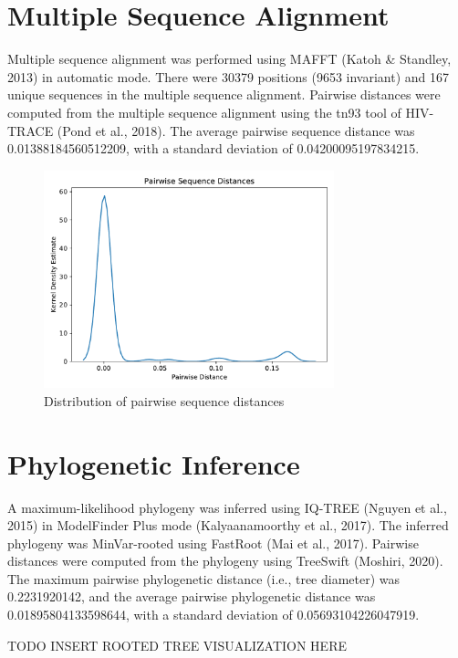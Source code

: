 \documentclass{article}
\begin{document}
\section{Multiple Sequence Alignment}
Multiple sequence alignment was performed using MAFFT (Katoh \& Standley, 2013) in automatic mode.
There were 30379 positions (9653 invariant) and 167 unique sequences in the multiple sequence alignment.
Pairwise distances were computed from the multiple sequence alignment using the tn93 tool of HIV-TRACE (Pond et al., 2018).
The average pairwise sequence distance was 0.01388184560512209,
with a standard deviation of 0.04200095197834215.


\begin{figure}[h]
\centering
\includegraphics[width=0.75\textwidth]{./figs/pairwise_distances_sequences.pdf}
\caption{Distribution of pairwise sequence distances}
\end{figure}

\section{Phylogenetic Inference}
A maximum-likelihood phylogeny was inferred using IQ-TREE (Nguyen et al., 2015) in ModelFinder Plus mode (Kalyaanamoorthy et al., 2017).
The inferred phylogeny was MinVar-rooted using FastRoot (Mai et al., 2017).
Pairwise distances were computed from the phylogeny using TreeSwift (Moshiri, 2020).
The maximum pairwise phylogenetic distance (i.e., tree diameter) was 0.2231920142,
and the average pairwise phylogenetic distance was 0.01895804133598644,
with a standard deviation of 0.05693104226047919.


TODO INSERT ROOTED TREE VISUALIZATION HERE
\end{document}
